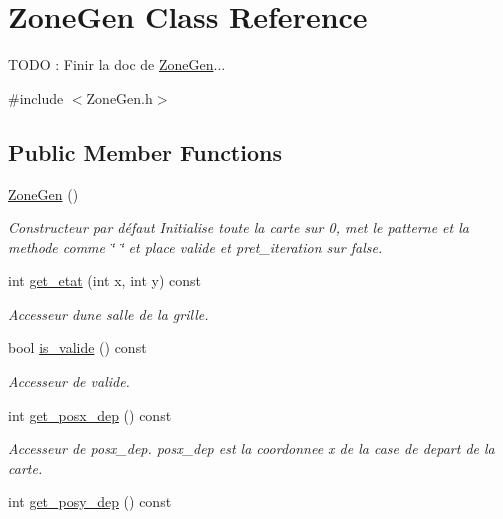 \hypertarget{classZoneGen}{}\section{Zone\+Gen Class Reference}
\label{classZoneGen}


T\+O\+DO \+: Finir la doc de \hyperlink{classZoneGen}{Zone\+Gen}...  




{\ttfamily \#include $<$Zone\+Gen.\+h$>$}

\subsection*{Public Member Functions}
\begin{DoxyCompactItemize}
\item 
\hyperlink{classZoneGen_aae2af3fc6b6db23a7b1f7091115ef392}{Zone\+Gen} ()
\begin{DoxyCompactList}\small\item\em Constructeur par défaut Initialise toute la carte sur 0, met le {\itshape patterne} et la {\itshape methode} comme \char`\"{} \char`\"{} et place {\itshape valide} et {\itshape pret\+\_\+iteration} sur false. \end{DoxyCompactList}\item 
int \hyperlink{classZoneGen_a893e3c5d0ae5ecc50bf19a5d90e89b45}{get\+\_\+etat} (int x, int y) const 
\begin{DoxyCompactList}\small\item\em Accesseur d\textquotesingle{}une \textquotesingle{}salle\textquotesingle{} de la grille. \end{DoxyCompactList}\item 
bool \hyperlink{classZoneGen_a0e073b705a18999388b0b85b7c11a080}{is\+\_\+valide} () const 
\begin{DoxyCompactList}\small\item\em Accesseur de {\itshape valide}. \end{DoxyCompactList}\item 
int \hyperlink{classZoneGen_ac64697de6f96b242b2fb191af66e1a30}{get\+\_\+posx\+\_\+dep} () const 
\begin{DoxyCompactList}\small\item\em Accesseur de {\itshape posx\+\_\+dep}. posx\+\_\+dep est la coordonnee x de la case de depart de la {\itshape carte}. \end{DoxyCompactList}\item 
int \hyperlink{classZoneGen_aa8a3a729f5d2106dbb47f33aa4d8bc9a}{get\+\_\+posy\+\_\+dep} () const 

\end{DoxyCompactItemize}

